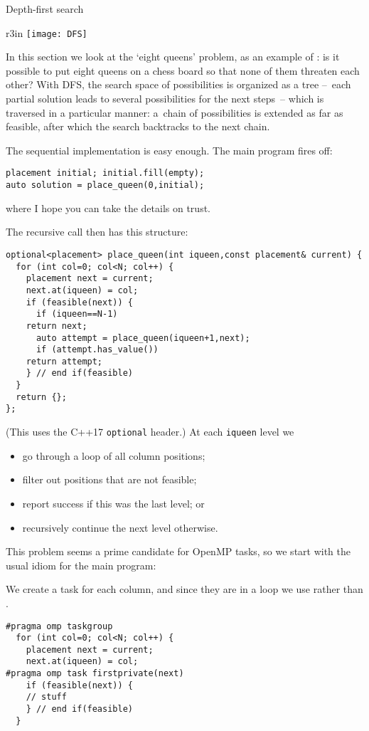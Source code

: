  {Depth-first search}
\label{sec:omp-dfs-example}
\lstset{language=C++}

\begin{wrapfigure}{r}{3in}
  \texttt{[image: DFS]}
\end{wrapfigure}
%
In this section we look at the `eight queens' problem, as an example of :
is it possible to put eight queens on a chess board so that none of them threaten each other?
With \ac{DFS}, the search space of possibilities is organized as a tree
--~each partial solution leads to several possibilities for the next steps~--
which is traversed in a particular manner:
a~chain of possibilities is extended as far as feasible,
after which the search backtracks to the next chain.

The sequential implementation is easy enough.
The main program fires off:
\begin{lstlisting}
placement initial; initial.fill(empty);
auto solution = place_queen(0,initial);
\end{lstlisting}
where I hope you can take the details on trust.

The recursive call then has this structure:
\begin{lstlisting}
optional<placement> place_queen(int iqueen,const placement& current) {
  for (int col=0; col<N; col++) {
    placement next = current;
    next.at(iqueen) = col;
    if (feasible(next)) {
      if (iqueen==N-1)
	return next;
      auto attempt = place_queen(iqueen+1,next);
      if (attempt.has_value())
	return attempt;
    } // end if(feasible)
  }
  return {};
};
\end{lstlisting}
(This uses the C++17 \lstinline{optional} header.)
At each \lstinline{iqueen} level we
\begin{itemize}
\item go through a loop of all column positions;
\item filter out positions that are not feasible;
\item report success if this was the last level; or
\item recursively continue the next level otherwise.
\end{itemize}

This problem seems a prime candidate for OpenMP tasks, so we start with the usual
idiom for the main program:
%

We create a task for each column, and since they are in a loop
we use  rather than .
\begin{lstlisting}
#pragma omp taskgroup
  for (int col=0; col<N; col++) {
    placement next = current;
    next.at(iqueen) = col;
#pragma omp task firstprivate(next)
    if (feasible(next)) {
    // stuff
    } // end if(feasible)
  }
\end{lstlisting}

